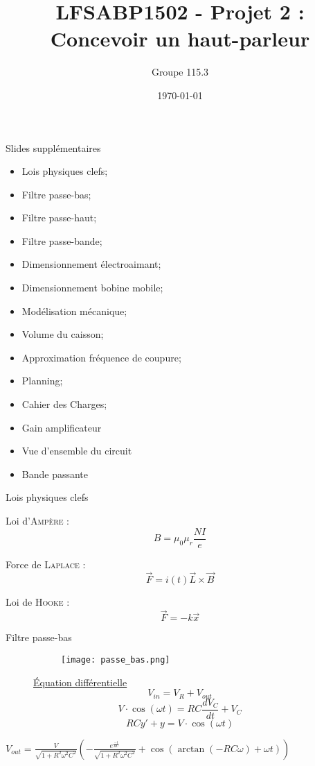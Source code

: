 \documentclass[pdf]{beamer}
\title{LFSABP1502 - Projet 2 : Concevoir un haut-parleur}
\author{Groupe 115.3}
\date{\today}
\begin{document}
\begin{frame}{Slides supplémentaires}
\begin{itemize}
\item  Lois physiques clefs;
\item  Filtre passe-bas;
\item  Filtre passe-haut;
\item  Filtre passe-bande;
\item  Dimensionnement électroaimant;
\item  Dimensionnement bobine mobile;
\item  Modélisation mécanique;
\item  Volume du caisson;
\item  Approximation fréquence de coupure;
\item  Planning;
\item  Cahier des Charges;
\item  Gain amplificateur
\item  Vue d'ensemble du circuit
\item  Bande passante
\end{itemize}
\end{frame}
\begin{frame}{Lois physiques clefs}

Loi d'\textsc{Ampère} :
$$B = \mu_0\mu_r\frac{NI}{e}$$

Force de \textsc{Laplace} :
$$\vec{F} = i(t)\vec{L}\times{\vec{B}}$$ 

Loi de \textsc{Hooke} :
$$\vec{F} = -k \vec{x}$$ 

\end{frame}

\begin{frame}{Filtre passe-bas}

	\begin{figure}[ht]
\begin{figure}[ht!]
    \centering
    \texttt{[image: passe\_bas.png]}
\end{figure}
\endminipage\hfill
{}
\underline{Équation différentielle}
$$V_{in} = V_R + V_{out}$$
$$V \cdot \cos (\omega t) = RC\frac{dV_C}{dt} + V_C$$
$$RCy' + y = V \cdot \cos (\omega t)$$
\endminipage\hfill
\end{figure}
$V_{out} = \frac{V}{\sqrt{1 + R^2\omega^2C^2}}
\left(-\frac{e^{\frac{-t}{RC}}}{\sqrt{1 + R^2\omega^2C^2}} + \cos(\arctan(-RC\omega) + \omega t)\right)
$

\end{frame}
\end{document}
